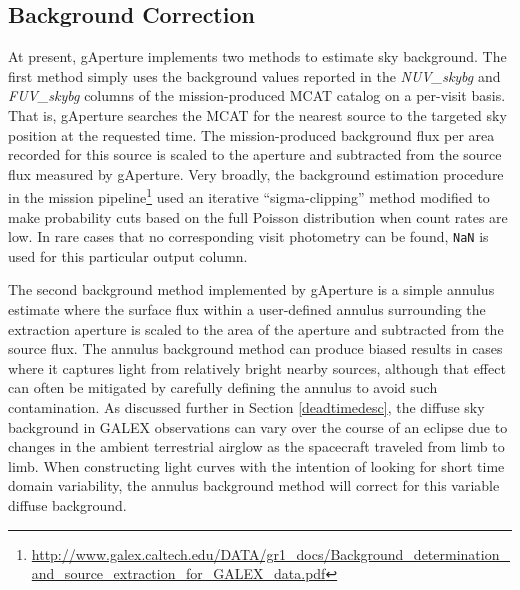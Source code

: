 \documentclass[preprint]{aastex}
\begin{document}
\subsection{Background Correction}
\label{bgcorr}
At present, gAperture implements two methods to estimate sky background. The first method simply uses the background values reported in the \emph{NUV\_skybg} and \emph{FUV\_skybg} columns of the mission-produced MCAT catalog on a per-visit basis. That is, gAperture searches the MCAT for the nearest source to the targeted sky position at the requested time. The mission-produced background flux per area recorded for this source is scaled to the aperture and subtracted from the source flux measured by gAperture. Very broadly, the background estimation procedure in the mission pipeline\footnote{\url{http://www.galex.caltech.edu/DATA/gr1_docs/Background_determination_and_source_extraction_for_GALEX_data.pdf}} used an iterative ``sigma-clipping'' method modified to make probability cuts based on the full Poisson distribution when count rates are low. In rare cases that no corresponding visit photometry can be found, \texttt{NaN} is used for this particular output column.

The second background method implemented by gAperture is a simple annulus estimate where the surface flux within a user-defined annulus surrounding the extraction aperture is scaled to the area of the aperture and subtracted from the source flux. The annulus background method can produce biased results in cases where it captures light from relatively bright nearby sources, although that effect can often be mitigated by carefully defining the annulus to avoid such contamination. As discussed further in Section \ref{deadtimedesc}, the diffuse sky background in GALEX observations can vary over the course of an eclipse due to changes in the ambient terrestrial airglow as the spacecraft traveled from limb to limb. When constructing light curves with the intention of looking for short time domain variability, the annulus background method will correct for this variable diffuse background.
\end{document}
